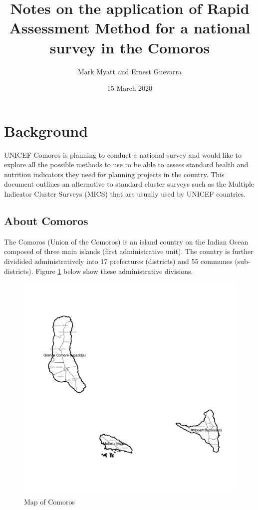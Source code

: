 \documentclass[12pt,a4paper]{article}
\title{\vspace{8cm} \LARGE{Notes on the application of Rapid Assessment Method for a national survey in the Comoros}}
\author{Mark Myatt and Ernest Guevarra}
\date{15 March 2020}
\begin{document}
\maketitle

\newpage

\newpage

\hypertarget{background}{%
\section{Background}\label{background}}

UNICEF Comoros is planning to conduct a national survey and would like to explore all the possible methods to use to be able to assess standard health and nutrition indicators they need for planning projects in the country. This document outlines an alternative to standard cluster surveys such as the Multiple Indicator Cluster Surveys (MICS) that are usually used by UNICEF countries.

\hypertarget{about-comoros}{%
\subsection{About Comoros}\label{about-comoros}}

The Comoros (Union of the Comoros) is an island country on the Indian Ocean composed of three main islands (first administrative unit). The country is further dividided administratively into 17 prefectures (districts) and 55 communes (sub-districts). Figure \ref{fig:comorosMap} below show these administrative divisions.

\begin{figure}[H]

{\centering \includegraphics[width=0.9\linewidth]{comorosNotes_files/figure-latex/comorosMap-1} 

}

\caption{Map of Comoros}\label{fig:comorosMap}
\end{figure}
\end{document}
